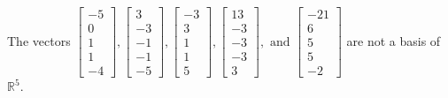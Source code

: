 \begin{exercise}
\begin{exerciseStatement}
  \end{exerciseStatement}
  \begin{exerciseAnswer}
   The vectors \(\left[\begin{array}{r}
-5 \\
0 \\
1 \\
1 \\
-4
\end{array}\right] , \left[\begin{array}{r}
3 \\
-3 \\
-1 \\
-1 \\
-5
\end{array}\right] , \left[\begin{array}{r}
-3 \\
3 \\
1 \\
1 \\
5
\end{array}\right] , \left[\begin{array}{r}
13 \\
-3 \\
-3 \\
-3 \\
3
\end{array}\right] , \text{ and } \left[\begin{array}{r}
-21 \\
6 \\
5 \\
5 \\
-2
\end{array}\right]\) 
  	 are not  a basis of \(\mathbb{R}^5\).
  


  \end{exerciseAnswer}
\end{exercise}